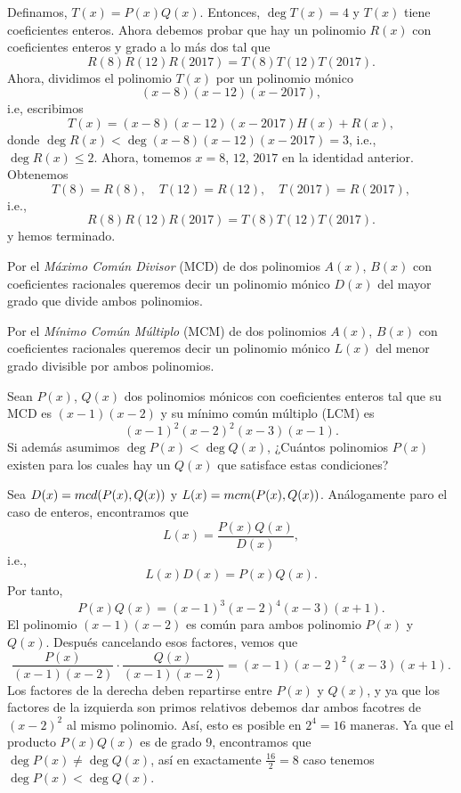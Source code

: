 \begin{solution}
    Definamos, $T(x)=P(x)Q(x)$.
    Entonces, $\deg T(x) = 4$ y $T(x)$ tiene coeficientes enteros.
    Ahora debemos probar que hay un polinomio $R(x)$ con coeficientes enteros y grado a lo más dos tal que
    \[
        R(8)R(12)R(2017)=T(8)T(12)T(2017).
    \]
    Ahora, dividimos el polinomio $T(x)$ por un polinomio mónico
    \[
        (x-8)(x-12)(x-2017),
    \]
    i.e, escribimos
    \[
        T(x)=(x-8)(x-12)(x-2017)H(x)+R(x),
    \]
    donde $\deg R(x) < \deg (x-8)(x-12)(x-2017)=3$, i.e., $\deg R(x) \leq 2$.
    Ahora, tomemos $x=8$, $12$, $2017$ en la identidad anterior. Obtenemos
    \[
        T(8)=R(8),\quad T(12)=R(12),\quad T(2017)=R(2017),
    \]
    i.e.,
    \[
        R(8)R(12)R(2017)=T(8)T(12)T(2017).
    \]
    y hemos terminado.
\end{solution}

Por el \textit{Máximo Común Divisor} (MCD) de dos polinomios $A(x)$, $B(x)$ con coeficientes racionales queremos decir un polinomio mónico $D(x)$ del mayor grado que divide ambos polinomios.

Por el \textit{Mínimo Común Múltiplo} (MCM) de dos polinomios $A(x)$, $B(x)$ con coeficientes racionales queremos decir un polinomio mónico $L(x)$ del menor grado divisible por ambos polinomios.

\begin{example}
    Sean $P(x)$, $Q(x)$ dos polinomios mónicos con coeficientes enteros tal que su MCD es $(x-1)(x-2)$ y su mínimo común múltiplo (LCM) es
    \[
        (x-1)^2(x-2)^2(x-3)(x-1).
    \]
    Si además asumimos $\deg P(x) < \deg Q(x)$, ¿Cuántos polinomios $P(x)$ existen para los cuales hay un $Q(x)$ que satisface estas condiciones?
\end{example}

\begin{solution}
    Sea $D(x)=mcd(P(x), Q(x))$ y $L(x) = mcm(P(x), Q(x))$.
    Análogamente paro el caso de enteros, encontramos que
    \[
        L(x) = \frac{P(x) Q(x)}{D(x)},
    \]
    i.e.,
    \[
        L(x) D(x) = P(x) Q(x).
    \]
    Por tanto,
    \[
        P(x) Q(x) = (x - 1)^3 (x - 2)^4 (x - 3) (x + 1).
    \]
    El polinomio $(x - 1)(x - 2)$ es común para ambos polinomio $P(x)$ y $Q(x)$.
    Después cancelando esos factores, vemos que
    \[
        \frac{P(x)}{(x - 1)(x - 2)} \cdot \frac{Q(x)}{(x - 1)(x - 2)} = (x - 1)(x - 2)^2 (x - 3)(x + 1).
    \]
    Los factores de la derecha deben repartirse entre $P(x)$ y $Q(x)$, y ya que los factores de la izquierda son primos relativos debemos dar ambos facotres de $(x - 2)^2$ al mismo polinomio.
    Así, esto es posible en $2^4 = 16$ maneras.
    Ya que el producto $P(x) Q(x)$ es de grado 9, encontramos que $\deg{P(x)} \neq \deg{Q(x)}$, así en exactamente $\frac{16}{2} = 8$ caso tenemos $\deg{P(x)} < \deg{Q(x)}$.
\end{solution}


